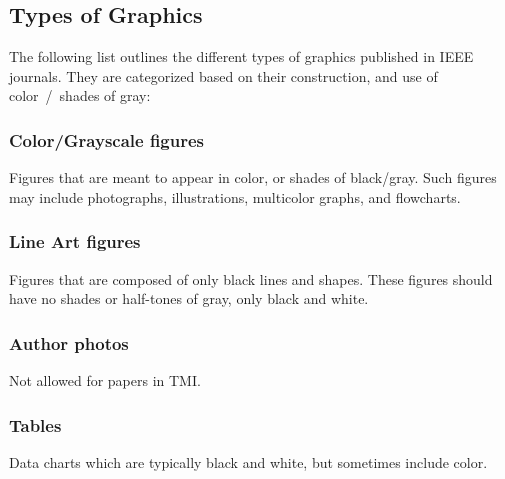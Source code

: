 \documentclass[journal,twoside,web]{ieeecolor}
\begin{document}
\subsection{Types of Graphics}
The following list outlines the different types of graphics published in 
IEEE journals. They are categorized based on their construction, and use of 
color~/~shades of gray:

\subsubsection{Color/Grayscale figures}
{Figures that are meant to appear in color, or shades of black/gray. Such 
figures may include photographs, illustrations, multicolor graphs, and 
flowcharts.}

\subsubsection{Line Art figures}
{Figures that are composed of only black lines and shapes. These figures 
should have no shades or half-tones of gray, only black and white.}

\subsubsection{Author photos}
{Not allowed for papers in TMI.}

\subsubsection{Tables}
{Data charts which are typically black and white, but sometimes include 
color.}
\end{document}
